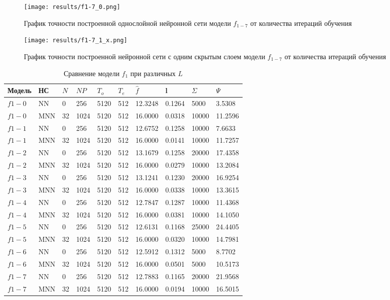       \begin{figure}[H]
  	\texttt{[image: results/f1-7\_0.png]}
  	
  	\caption{График точности построенной однослойной нейронной сети модели $f_{1-7}$ от количества итераций обучения}
  	
  \end{figure}
  
  \begin{figure}[H]
  	\texttt{[image: results/f1-7\_1\_x.png]}
  	
  	\caption{График точности построенной нейронной сети с одним скрытым слоем модели $f_{1-7}$  от количества итераций обучения}
  \end{figure}
  
\begin{table}[H]
	\begin{tabular}{|l|l|l|l|l|l|l|l|l|l|}
		\hline
Модель   & НС  & $N$&$NP$&$T_o$& $T_e$  & $\hat{f}$ & l   & $\Sigma$ & $\Psi$ \\ \hline  
$ f1-0 $ & NN  & 0  & 256  & 5120 & 512 & 12.3248 & 0.1264 & 5000 & 3.5308 \\ \hline
$ f1-0 $ & MNN & 32 & 1024 & 5120 & 512 & 16.0000 & 0.0318 & 10000 & 11.2596 \\ \hline
$ f1-1 $ & NN  & 0  & 256  & 5120 & 512 & 12.6752 & 0.1258 & 10000 & 7.6633 \\ \hline
$ f1-1 $ & MNN & 32 & 1024 & 5120 & 512 & 16.0000 & 0.0141 & 10000 & 11.7257 \\ \hline
$ f1-2 $ & NN  & 0  & 256  & 5120 & 512 & 13.1679 & 0.1258 & 20000 & 17.4358 \\ \hline
$ f1-2 $ & MNN & 32 & 1024 & 5120 & 512 & 16.0000 & 0.0279 & 10000 & 13.2084 \\ \hline
$ f1-3 $ & NN  & 0  & 256  & 5120 & 512 & 13.1241 & 0.1230 & 20000 & 16.9254 \\ \hline
$ f1-3 $ & MNN & 32 & 1024 & 5120 & 512 & 16.0000 & 0.0338 & 10000 & 13.3615 \\ \hline
$ f1-4 $ & NN  & 0  & 256  & 5120 & 512 & 12.7847 & 0.1287 & 10000 & 11.4368 \\ \hline
$ f1-4 $ & MNN & 32 & 1024 & 5120 & 512 & 16.0000 & 0.0381 & 10000 & 14.1050 \\ \hline
$ f1-5 $ & NN  & 0  & 256  & 5120 & 512 & 12.6131 & 0.1168 & 25000 & 24.4405 \\ \hline
$ f1-5 $ & MNN & 32 & 1024 & 5120 & 512 & 16.0000 & 0.0320 & 10000 & 14.7981 \\ \hline
$ f1-6 $ & NN  & 0  & 256  & 5120 & 512 & 12.5912 & 0.1312 & 5000 & 8.7702 \\ \hline
$ f1-6 $ & MNN & 32 & 1024 & 5120 & 512 & 16.0000 & 0.0501 & 5000 & 10.5173 \\ \hline
$ f1-7 $ & NN  & 0  & 256  & 5120 & 512 & 12.7883 & 0.1165 & 20000 & 21.9568 \\ \hline
$ f1-7 $ & MNN & 32 & 1024 & 5120 & 512 & 16.0000 & 0.0194 & 10000 & 16.5015 \\ \hline
  
  \hline
\end{tabular}
\caption{Сравнение модели $f_1$ при различных $L$}
\label{diff_f1}
\end{table} 

